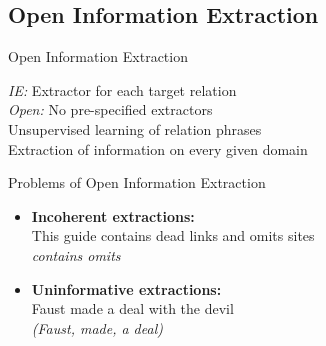 \documentclass[11pt]{beamer}
\begin{document}
	\subsection{Open Information Extraction}
		\begin{frame}{Open Information Extraction}
			\begin{center}
				
				\textit{IE:} Extractor for each target relation\\
				\vspace{10pt}
				\textit{Open:} No pre-specified extractors\\
				\vspace{10pt}
				Unsupervised learning of relation phrases\\
				\vspace{10pt}
				Extraction of information on every given domain

			\end{center}
		\end{frame}
		\begin{frame}{Problems of Open Information Extraction}
					\begin{center}
						\begin{itemize}
						\item \textbf{Incoherent extractions:}\\
							This guide contains dead links and omits sites
							\\\textit{contains omits}
						\item \textbf{Uninformative extractions:}\\
							Faust made a deal with the devil
							\\ \textit{(Faust, made, a deal)}
						\end{itemize}
					\end{center}
				\end{frame}
\end{document}
